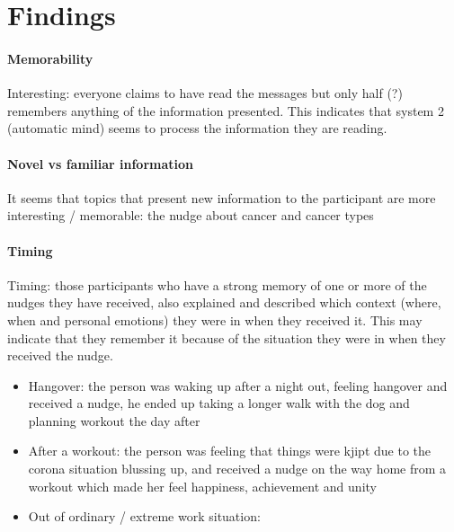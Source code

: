 \chapter{Findings}


\subsubsection{Memorability}
Interesting: everyone claims to have read the messages but only half (?) remembers anything of the information presented. This indicates that system 2 (automatic mind) seems to process the information they are reading. 


\subsubsection{Novel vs familiar information}
It seems that topics that present new information to the participant are more interesting / memorable: the nudge about cancer and cancer types

\subsubsection{Timing}
Timing: those participants who have a strong memory of one or more of the nudges they have received, also explained and described which context (where, when and personal emotions) they were in when they received it. This may indicate that they remember it because of the situation they were in when they received the nudge.
\begin{itemize}
\item Hangover: the person was waking up after a night out, feeling hangover and received a nudge, he ended up taking a longer walk with the dog and planning workout the day after
\item After a workout: the person was feeling that things were kjipt due to the corona situation blussing up, and received a nudge on the way home from a workout which made her feel happiness, achievement and unity 
\item Out of ordinary / extreme work situation: 
\end{itemize}

